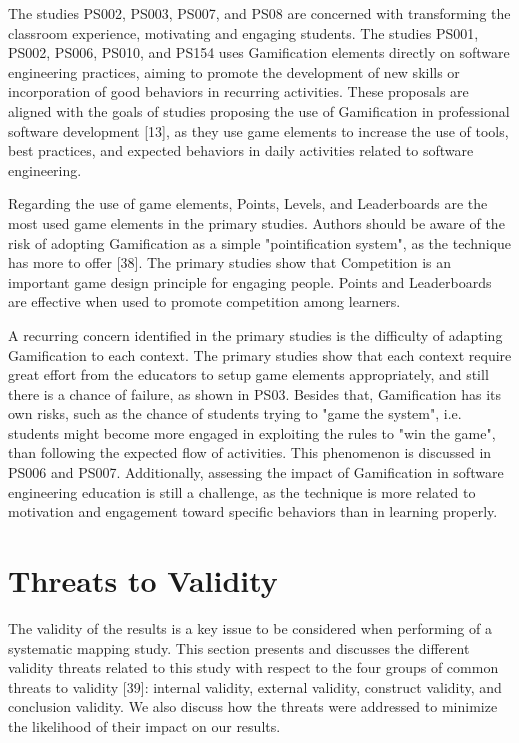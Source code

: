 The studies PS002, PS003, PS007, and PS08 are concerned with transforming the classroom experience, motivating and engaging students. The studies PS001, PS002, PS006, PS010, and PS154 uses Gamification elements directly on software engineering practices, aiming to promote the development of new skills or incorporation of good behaviors in recurring activities. These proposals are aligned with the goals of studies proposing the use of Gamification in professional software development \citep{Pedreira:2015}[13], as they use game elements to increase the use of tools, best practices, and expected behaviors in daily activities related to software engineering. 

Regarding the use of game elements, Points, Levels, and Leaderboards are the most used game elements in the primary studies. Authors should be aware of the risk of adopting Gamification as a simple "pointification system", as the technique has more to offer \citep{Werbach:2012}[38]. The primary studies show that Competition is an important game design principle for engaging people. Points and Leaderboards are effective when used to promote competition among learners.

A recurring concern identified in the primary studies is the difficulty of adapting Gamification to each context. The primary studies show that each context require great effort from the educators to setup game elements appropriately, and still there is a chance of failure, as shown in PS03. Besides that, Gamification has its own risks, such as the chance of students trying to "game the system", i.e. students might become more engaged in exploiting the rules to "win the game", than following the expected flow of activities. This phenomenon is discussed in PS006 and PS007. Additionally, assessing the impact of Gamification in software engineering education is still a challenge, as the technique is more related to motivation and engagement toward specific behaviors than in learning properly.

\section{Threats to Validity}
\label{sec:smsthreats}

The validity of the results is a key issue to be considered when performing of a systematic mapping study. This section presents and discusses the different validity threats related to this study with respect to the four groups of common threats to validity \citep{Wohlin:2012}[39]: internal validity, external validity, construct validity, and conclusion validity. We also discuss how the threats were addressed to minimize the likelihood of their impact on our results. 

